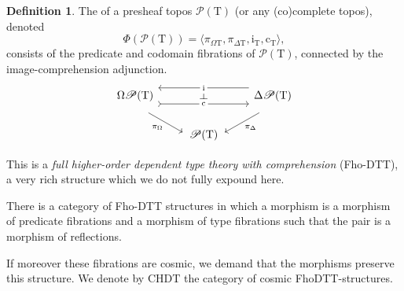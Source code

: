 \documentclass[12pt]{article}
\theoremstyle{definition}
\newtheorem{definition}[theorem]{Definition}
\newcommand{\define}[1]{{\bf \boldmath{#1}}}
\newcommand{\msc}[1]{\mathscr{#1}}
\newcommand{\mrm}[1]{\mathrm{#1}}
\newcommand{\lrh}{\leftrightharpoons}
\newcommand{\T}{\mrm{T}}
\newcommand{\pow}{\msc{P}}
\begin{document}
\begin{definition}
    The \define{native structure} of a presheaf topos $\pow(\T)$ (or any (co)complete topos), denoted \[\Phi(\pow(\T))=\langle \pi_{\Omega\T},\pi_{\Delta\T},\mrm{i}_\T,\mrm{c}_\T\rangle,\] consists of the predicate and codomain fibrations of $\pow(\T)$, connected by the image-comprehension adjunction.
    \[\begin{tikzcd}
    	{\Omega\pow(\T)} && {\Delta\pow(\T)} \\
    	& {\pow(\T)}
    	\arrow["{\mrm{c}}"{name=0, description}, from=1-1, to=1-3, shift right=3, tail]
    	\arrow["\mrm{i}"{name=1, description}, from=1-3, to=1-1, shift right=3]
    	\arrow["{\pi_\Delta}", from=1-3, to=2-2, shift left=3]
    	\arrow["{\pi_\Omega}"', from=1-1, to=2-2, shift right=3]
    	\arrow["\dashv"{rotate=-90}, from=1, to=0, phantom]
    \end{tikzcd}\]
\end{definition}

This is a \textit{full higher-order dependent type theory with comprehension} \cite[Sec. 11.6]{jacobs} (Fho-DTT), a very rich structure which we do not fully expound here.

There is a category of Fho-DTT structures in which a morphism is a morphism of predicate fibrations and a morphism of type fibrations such that the pair is a morphism of reflections.


If moreover these fibrations are cosmic, we demand that the morphisms preserve this structure. We denote by $\mrm{CHDT}$ the category of cosmic FhoDTT-structures.
\end{document}
